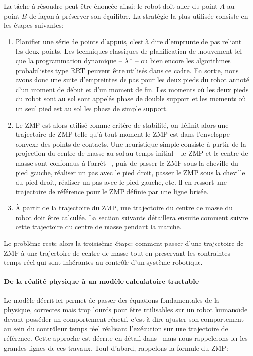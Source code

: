 La tâche à résoudre peut être énoncée ainsi: le robot doit aller du
point $A$ au point $B$ de façon à préserver son équilibre. La
stratégie la plus utilisée consiste en les étapes suivantes:
\begin{enumerate}
\item Planifier une série de points d'appuis, c'est à dire d'emprunte
  de pas reliant les deux points. Les techniques classiques de
  planification de mouvement tel que la programmation dynamique -- A*
  -- ou bien encore les algorithmes probabilistes type RRT peuvent
  être utilisés dans ce cadre. En sortie, nous avons donc une suite
  d'empreintes de pas pour les deux pieds du robot annoté d'un moment
  de début et d'un moment de fin. Les moments où les deux pieds du
  robot sont au sol sont appelés phase de double support et les
  moments où un seul pied est au sol les phase de simple support.
\item Le ZMP est alors utilisé comme critère de stabilité, on définit
  alors une trajectoire de ZMP telle qu'à tout moment le ZMP est dans
  l'enveloppe convexe des points de contacts. Une heuristique simple
  consiste à partir de la projection du centre de masse au sol au
  temps initial -- le ZMP et le centre de masse sont confondus à
  l'arrêt --, puis de passer le ZMP sous la cheville du pied gauche,
  réaliser un pas avec le pied droit, passer le ZMP sous la cheville
  du pied droit, réaliser un pas avec le pied gauche, etc. Il en
  ressort une trajectoire de référence pour le ZMP définie par une
  ligne brisée.
\item À partir de la trajectoire du ZMP, une trajectoire du centre de
  masse du robot doit être calculée. La section suivante détaillera
  ensuite comment suivre cette trajectoire du centre de masse pendant
  la marche.
\end{enumerate}

Le problème reste alors la troisisème étape: comment passer d'une
trajectoire de ZMP à une trajectoire de centre de masse tout en
préservant les contraintes temps réel qui sont inhérantes au contrôle
d'un système robotique.

\paragraph{De la réalité physique à un modèle calculatoire tractable}


Le modèle décrit ici permet de passer des équations fondamentales de
la physique, correctes mais trop lourds pour être utilisables sur un
robot humanoïde devant posséder un comportement réactif, c'est à dire
ajuster son comportement au sein du contrôleur temps réel réalisant
l'exécution sur une trajectoire de référence. Cette approche est
décrite en détail dans~\cite{10icra.perrin} mais nous rappelerons ici
les grandes lignes de ces travaux. Tout d'abord, rappelons la formule
du ZMP:

